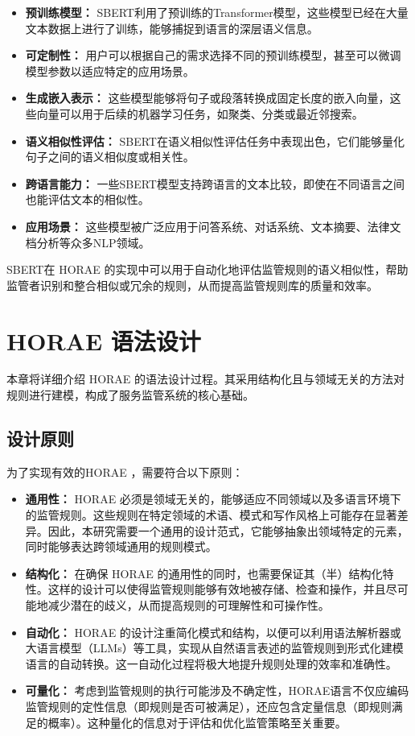 \begin{itemize}
    \item \textbf{预训练模型：} SBERT利用了预训练的Transformer\cite{han2021transformer}模型，这些模型已经在大量文本数据上进行了训练，能够捕捉到语言的深层语义信息。
    \item \textbf{可定制性：} 用户可以根据自己的需求选择不同的预训练模型，甚至可以微调模型参数以适应特定的应用场景。
    \item \textbf{生成嵌入表示：} 这些模型能够将句子或段落转换成固定长度的嵌入向量，这些向量可以用于后续的机器学习任务，如聚类、分类或最近邻搜索。
    \item \textbf{语义相似性评估：} SBERT在语义相似性评估任务中表现出色，它们能够量化句子之间的语义相似度或相关性。
    \item \textbf{跨语言能力：} 一些SBERT模型支持跨语言的文本比较，即使在不同语言之间也能评估文本的相似性。
    \item \textbf{应用场景：} 这些模型被广泛应用于问答系统、对话系统、文本摘要、法律文档分析等众多NLP领域。
\end{itemize}

SBERT在 HORAE 的实现中可以用于自动化地评估监管规则的语义相似性，帮助监管者识别和整合相似或冗余的规则，从而提高监管规则库的质量和效率。

\newpage

\section{HORAE 语法设计}

本章将详细介绍 HORAE 的语法设计过程。其采用结构化且与领域无关的方法对规则进行建模，构成了服务监管系统的核心基础。

\subsection{设计原则}

为了实现有效的HORAE ，需要符合以下原则：

\begin{itemize}
    \item \textbf{通用性：} HORAE 必须是领域无关的，能够适应不同领域以及多语言环境下的监管规则。这些规则在特定领域的术语、模式和写作风格上可能存在显著差异。因此，本研究需要一个通用的设计范式，它能够抽象出领域特定的元素，同时能够表达跨领域通用的规则模式。
    \item \textbf{结构化：} 在确保 HORAE 的通用性的同时，也需要保证其（半）结构化特性。这样的设计可以使得监管规则能够有效地被存储、检查和操作，并且尽可能地减少潜在的歧义，从而提高规则的可理解性和可操作性。
    \item \textbf{自动化：} HORAE 的设计注重简化模式和结构，以便可以利用语法解析器或大语言模型（LLMs）等工具，实现从自然语言表述的监管规则到形式化建模语言的自动转换。这一自动化过程将极大地提升规则处理的效率和准确性。
    \item \textbf{可量化：} 考虑到监管规则的执行可能涉及不确定性，HORAE语言不仅应编码监管规则的定性信息（即规则是否可被满足），还应包含定量信息（即规则满足的概率）。这种量化的信息对于评估和优化监管策略至关重要。
\end{itemize}

